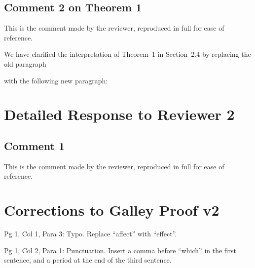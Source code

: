 \documentclass[letterpaper,10pt,twocolumn]{article}
\begin{document}
\subsection{Comment 2 on Theorem 1}

\begin{Reviewer1}
This is the comment made by the reviewer, reproduced in full for ease of reference.
\lipsum[3]
\end{Reviewer1}

We have clarified the interpretation of Theorem~1 in Section~2.4 by replacing the old paragraph

\begin{PreviousVersion}
\lipsum[1]
\end{PreviousVersion}

\noindent
with the following new paragraph:

\begin{RevisedVersion}
\lipsum[2]
\end{RevisedVersion}


\section{Detailed Response to Reviewer 2}

\subsection{Comment 1}

\begin{Reviewer2}
This is the comment made by the reviewer, reproduced in full for ease of reference.
\lipsum[6]
\end{Reviewer2}

\lipsum[7]


\section{Corrections to Galley Proof v2}

\begin{CheckBoxItem}
{Pg 1, Col 1, Para 3: Typo.}
Replace ``affect'' with ``effect''.
\end{CheckBoxItem}

\begin{CheckBoxItem}
{Pg 1, Col 2, Para 1: Punctuation.}
Insert a comma before ``which'' in the first sentence, and a period at the end of the third sentence.
\end{CheckBoxItem}
\end{document}
